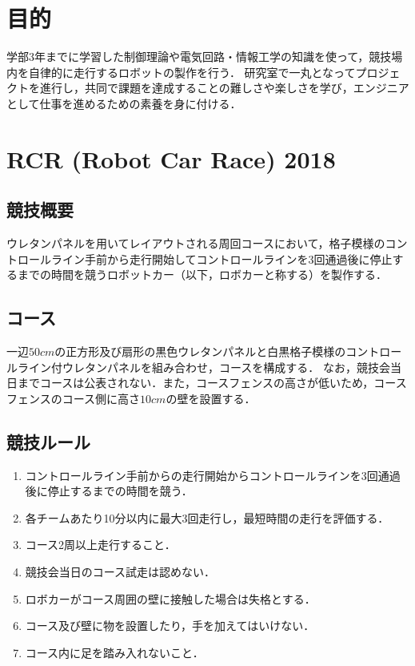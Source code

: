 \documentclass[11pt,a4j]{jarticle}
\begin{document}


\newpage
	\tableofcontents

\newpage
\section{目的}
	学部3年までに学習した制御理論や電気回路・情報工学の知識を使って，競技場内を自律的に走行するロボットの製作を行う．
	研究室で一丸となってプロジェクトを進行し，共同で課題を達成することの難しさや楽しさを学び，エンジニアとして仕事を進めるための素養を身に付ける．

\section{RCR (Robot Car Race) 2018}

\subsection{競技概要}
	ウレタンパネルを用いてレイアウトされる周回コースにおいて，格子模様のコントロールライン手前から走行開始してコントロールラインを3回通過後に停止するまでの時間を競うロボットカー（以下，ロボカーと称する）を製作する．

\subsection{コース}
	一辺$50\unit{cm}$の正方形及び扇形の黒色ウレタンパネルと白黒格子模様のコントロールライン付ウレタンパネルを組み合わせ，コースを構成する．
	なお，競技会当日までコースは公表されない．また，コースフェンスの高さが低いため，コースフェンスのコース側に高さ$10\unit{cm}$の壁を設置する．

\subsection{競技ルール}
	\begin{enumerate}
      \item コントロールライン手前からの走行開始からコントロールラインを3回通過後に停止するまでの時間を競う．
      \item 各チームあたり10分以内に最大3回走行し，最短時間の走行を評価する．
      \item コース2周以上走行すること．
      \item 競技会当日のコース試走は認めない．
      \item ロボカーがコース周囲の壁に接触した場合は失格とする．
      \item コース及び壁に物を設置したり，手を加えてはいけない．
      \item コース内に足を踏み入れないこと．
    \end{enumerate}
\end{document}
